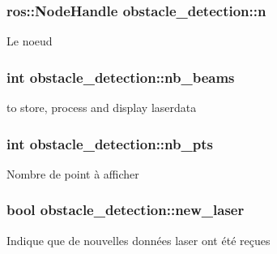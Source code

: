\subsubsection[{\texorpdfstring{n}{n}}]{\setlength{\rightskip}{0pt plus 5cm}ros\+::\+Node\+Handle obstacle\+\_\+detection\+::n\hspace{0.3cm}{\ttfamily [private]}}\hypertarget{classobstacle__detection_af9d47d5799c2f8235a6b23e648017527}{}\label{classobstacle__detection_af9d47d5799c2f8235a6b23e648017527}
Le noeud 
\subsubsection[{\texorpdfstring{nb\+\_\+beams}{nb_beams}}]{\setlength{\rightskip}{0pt plus 5cm}int obstacle\+\_\+detection\+::nb\+\_\+beams\hspace{0.3cm}{\ttfamily [private]}}\hypertarget{classobstacle__detection_a165b85127bd657c5e02f64374ac99243}{}\label{classobstacle__detection_a165b85127bd657c5e02f64374ac99243}
to store, process and display laserdata 
\subsubsection[{\texorpdfstring{nb\+\_\+pts}{nb_pts}}]{\setlength{\rightskip}{0pt plus 5cm}int obstacle\+\_\+detection\+::nb\+\_\+pts\hspace{0.3cm}{\ttfamily [private]}}\hypertarget{classobstacle__detection_ae1e9d58e1328625c5522e76faaa1b9d6}{}\label{classobstacle__detection_ae1e9d58e1328625c5522e76faaa1b9d6}
Nombre de point à afficher 
\subsubsection[{\texorpdfstring{new\+\_\+laser}{new_laser}}]{\setlength{\rightskip}{0pt plus 5cm}bool obstacle\+\_\+detection\+::new\+\_\+laser\hspace{0.3cm}{\ttfamily [private]}}\hypertarget{classobstacle__detection_afe40b9f71690dbb3595560e0f271c0b0}{}\label{classobstacle__detection_afe40b9f71690dbb3595560e0f271c0b0}
Indique que de nouvelles données laser ont été reçues 
